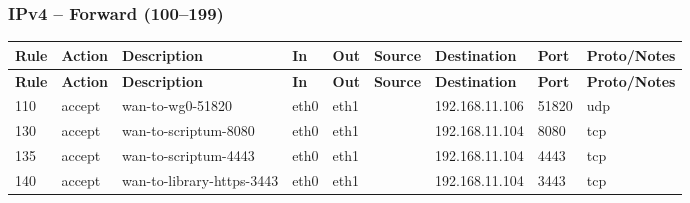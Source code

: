 \documentclass[a4paper,11pt]{article}
\begin{document}
\begin{landscape}
\subsubsection{IPv4 -- Forward (100--199)}
\begin{longtable}{|l|l|l|l|l|l|l|p{2.2cm}|l|}
\hline
\textbf{Rule} & \textbf{Action} & \textbf{Description} & \textbf{In} & \textbf{Out} & \textbf{Source} & \textbf{Destination} & \textbf{Port} & \textbf{Proto/Notes} \\
\hline
\endfirsthead
\hline
\textbf{Rule} & \textbf{Action} & \textbf{Description} & \textbf{In} & \textbf{Out} & \textbf{Source} & \textbf{Destination} & \textbf{Port} & \textbf{Proto/Notes} \\
\hline
\endhead
110 & accept & wan-to-wg0-51820 & eth0 & eth1 & & 192.168.11.106 & 51820 & udp \\
130 & accept & wan-to-scriptum-8080 & eth0 & eth1 & & 192.168.11.104 & 8080 & tcp \\
135 & accept & wan-to-scriptum-4443 & eth0 & eth1 & & 192.168.11.104 & 4443 & tcp \\
140 & accept & wan-to-library-https-3443 & eth0 & eth1 & & 192.168.11.104 & 3443 & tcp \\
\hline
\end{longtable}


\end{landscape}
\end{document}

